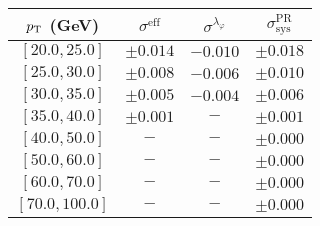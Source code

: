 \begin{tabular}{c||c|c||c}
$p_\text{T}$ (GeV) & $\sigma^{\text{eff}}$ & $\sigma^{\lambda_\varphi}$ & $\sigma_{\text{sys}}^{\text{PR}}$  \\
\hline
$[20.0, 25.0]$ & $\pm0.014$ & $-0.010$ & $\pm0.018$\\
$[25.0, 30.0]$ & $\pm0.008$ & $-0.006$ & $\pm0.010$\\
$[30.0, 35.0]$ & $\pm0.005$ & $-0.004$ & $\pm0.006$\\
$[35.0, 40.0]$ & $\pm0.001$ & $-$ & $\pm0.001$\\
$[40.0, 50.0]$ & $-$ & $-$ & $\pm0.000$\\
$[50.0, 60.0]$ & $-$ & $-$ & $\pm0.000$\\
$[60.0, 70.0]$ & $-$ & $-$ & $\pm0.000$\\
$[70.0, 100.0]$ & $-$ & $-$ & $\pm0.000$\\
\end{tabular}
